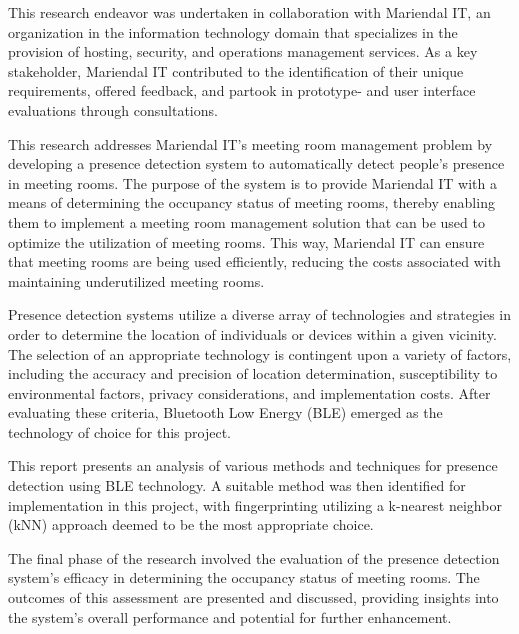 This research endeavor was undertaken in collaboration with Mariendal IT, an organization in the information technology domain that specializes in the provision of hosting, security, and operations management services\cite{Mariendal_OmOs}.
As a key stakeholder, Mariendal IT contributed to the identification of their unique requirements, offered feedback, and partook in prototype- and user interface evaluations through consultations.

This research addresses Mariendal IT's meeting room management problem by developing a presence detection system to automatically detect people's presence in meeting rooms.
The purpose of the system is to provide Mariendal IT with a means of determining the occupancy status of meeting rooms, thereby enabling them to implement a meeting room management solution that can be used to optimize the utilization of meeting rooms.
This way, Mariendal IT can ensure that meeting rooms are being used efficiently, reducing the costs associated with maintaining underutilized meeting rooms.

Presence detection systems utilize a diverse array of technologies and strategies in order to determine the location of individuals or devices within a given vicinity.
The selection of an appropriate technology is contingent upon a variety of factors, including the accuracy and precision of location determination, susceptibility to environmental factors, privacy considerations, and implementation costs.
After evaluating these criteria, Bluetooth Low Energy (BLE) emerged as the technology of choice for this project.

This report presents an analysis of various methods and techniques for presence detection using BLE technology.
A suitable method was then identified for implementation in this project, with fingerprinting utilizing a k-nearest neighbor (kNN) approach deemed to be the most appropriate choice.

The final phase of the research involved the evaluation of the presence detection system's efficacy in determining the occupancy status of meeting rooms.
The outcomes of this assessment are presented and discussed, providing insights into the system's overall performance and potential for further enhancement.
